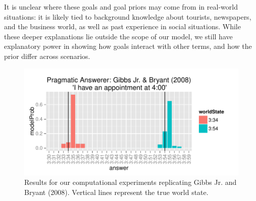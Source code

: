 \documentclass[12pt, floatsintext, jou]{apa6}
\begin{document}

It is unclear where these goals and goal priors may come from in real-world situations: it is likely tied to background knowledge about tourists, newspapers, and the business world, as well as past experience in social situations. While these deeper explanations lie outside the scope of our model, we still have explanatory power in showing how goals interact with other terms, and how the prior differ across scenarios. 

 \begin{figure}[t!]
\begin{center}
\includegraphics[scale = 1]{timeExpResults.pdf}
\end{center}
\vspace{-.25cm}
\caption{Results for our computational experiments replicating Gibbs Jr. and Bryant (2008). Vertical lines represent the true world state.}
\label{fig:timeExperimentResults}
\end{figure}
\end{document}
